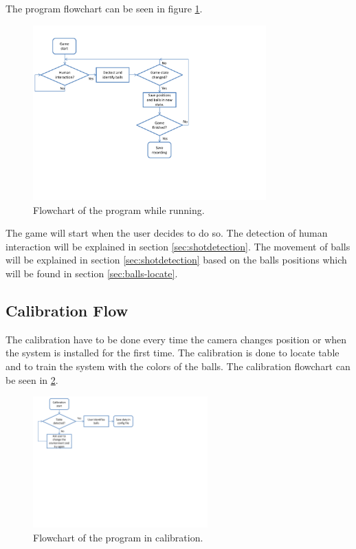 The program flowchart can be seen in figure \ref{fig:program_flowchart}.\\

\begin{figure}[H]
\begin{center}
\leavevmode
\includegraphics[width=0.8\textwidth]{images/program_flowchart}
\end{center}
\caption{Flowchart of the program while running.}
\label{fig:program_flowchart}
\end{figure}

The game will start when the user decides to do so. The detection of human interaction will be explained in section \ref{sec:shotdetection}. The movement of balls will be explained in section \ref{sec:shotdetection} based on the balls positions which will be found in section \ref{sec:balls-locate}.

\subsection{Calibration Flow}
The calibration have to be done every time the camera changes position or when the system is installed for the first time. The calibration is done to locate table and to train the system with the colors of the balls. The calibration flowchart can be seen in \ref{fig:calib_flowchart}.\\

\begin{figure}[H]
\begin{center}
\leavevmode
\includegraphics[width=0.6\textwidth]{images/calib_flowchart}
\end{center}
\caption{Flowchart of the program in calibration.}
\label{fig:calib_flowchart}
\end{figure}

